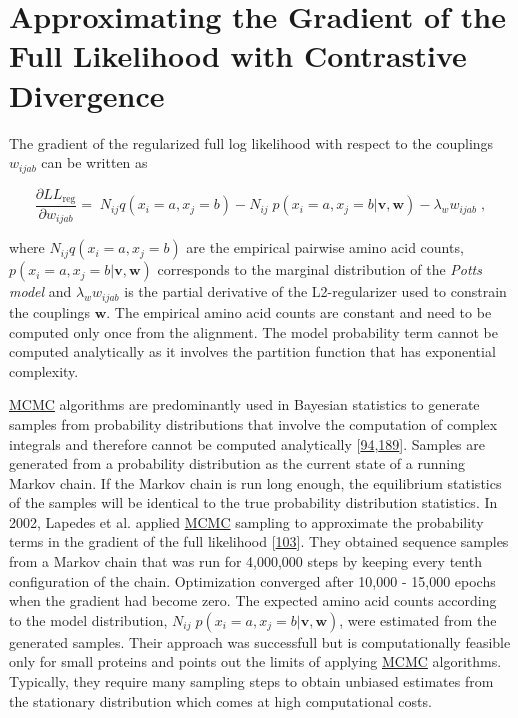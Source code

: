 \documentclass[11pt,a4paper,twoside]{book}
\newcommand{\eq}{\!=\!}
\newcommand{\LLreg}{L\!L_\mathrm{reg}}
\renewcommand{\v}{\mathbf{v}}
\newcommand{\w}{\mathbf{w}}
\newcommand{\wijab}{w_{ijab}}
\theoremstyle{definition}
\theoremstyle{definition}
\theoremstyle{remark}
\begin{document}
\section{Approximating the Gradient of the Full Likelihood with
Contrastive Divergence}\label{full-likelihood-gradient}

The gradient of the regularized full log likelihood with respect to the
couplings \(\wijab\) can be written as

\begin{equation}
    \frac{\partial \LLreg}{\partial \wijab} = \; N_{ij} q(x_i \eq a, x_j=b) - N_{ij} \; p(x_i \eq a, x_j \eq b | \v,\w) - \lambda_w \wijab  \; ,
\label{eq:gradient-wijab-full-likelihood-approx}
\end{equation}

where \(N_{ij} q(x_i \eq a, x_j=b)\) are the empirical pairwise amino
acid counts, \(p(x_i \eq a, x_j \eq b | \v,\w)\) corresponds to the
marginal distribution of the \emph{Potts model} and \(\lambda_w \wijab\)
is the partial derivative of the L2-regularizer used to constrain the
couplings \(\w\). The empirical amino acid counts are constant and need
to be computed only once from the alignment. The model probability term
cannot be computed analytically as it involves the partition function
that has exponential complexity.

\protect\hyperlink{abbrev}{MCMC} algorithms are predominantly used in
Bayesian statistics to generate samples from probability distributions
that involve the computation of complex integrals and therefore cannot
be computed analytically
{[}\protect\hyperlink{ref-Murphy2012}{94},\protect\hyperlink{ref-Andrieu2003}{189}{]}.
Samples are generated from a probability distribution as the current
state of a running Markov chain. If the Markov chain is run long enough,
the equilibrium statistics of the samples will be identical to the true
probability distribution statistics. In 2002, Lapedes et al. applied
\protect\hyperlink{abbrev}{MCMC} sampling to approximate the probability
terms in the gradient of the full likelihood
{[}\protect\hyperlink{ref-Lapedes2012a}{103}{]}. They obtained sequence
samples from a Markov chain that was run for 4,000,000 steps by keeping
every tenth configuration of the chain. Optimization converged after
10,000 - 15,000 epochs when the gradient had become zero. The expected
amino acid counts according to the model distribution,
\(N_{ij} \; p(x_i \eq a, x_j \eq b | \v,\w)\), were estimated from the
generated samples. Their approach was successfull but is computationally
feasible only for small proteins and points out the limits of applying
\protect\hyperlink{abbrev}{MCMC} algorithms. Typically, they require
many sampling steps to obtain unbiased estimates from the stationary
distribution which comes at high computational costs.
\end{document}
